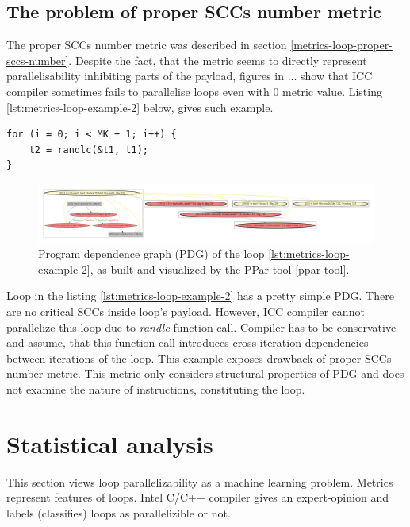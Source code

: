 \subsection{The problem of proper SCCs number metric}
\qquad The proper SCCs number metric was described in section \ref{metrics-loop-proper-sccs-number}. Despite the fact, that the metric seems to directly represent parallelisability inhibiting parts of the payload, figures in ... show that ICC compiler sometimes fails to parallelise loops even with 0 metric value. Listing \ref{lst:metrics-loop-example-2} below, gives such example.

\begin{lstlisting}[caption={Non-parallelizible loop. Function call inside loop's body prevents ICC compiler from parallelizing it. Loop taken from EP NAS benchmark.}, captionpos=b, label=lst:metrics-loop-example-2]
for (i = 0; i < MK + 1; i++) {
	t2 = randlc(&t1, t1);
}
\end{lstlisting}

\begin{figure}[htb]
	\centering
	\includegraphics[width=\linewidth]{figs/metrics-example-loop-2-pdg.pdf}
	\caption{Program dependence graph (PDG) of the loop \ref{lst:metrics-loop-example-2}, as built and visualized by the PPar tool \ref{ppar-tool}.}
	\label{metrics-example-loop-2-pdg}
\end{figure}

\null\qquad Loop in the listing \ref{lst:metrics-loop-example-2} has a pretty simple PDG. There are no critical SCCs inside loop's payload. However, ICC compiler cannot parallelize this loop due to \textit{randlc} function call. Compiler has to be conservative and assume, that this function call introduces cross-iteration dependencies between iterations of the loop.\newline
\null\qquad This example exposes drawback of proper SCCs number metric. This metric only considers structural properties of PDG and does not examine the nature of instructions, constituting the loop. 


\section{Statistical analysis}
\label{analysis-statistical-analysis}
\qquad This section views loop parallelizability as a machine learning problem. Metrics represent features of loops. Intel C/C++ compiler gives an expert-opinion and labels (classifies) loops as parallelizible or not.
   
